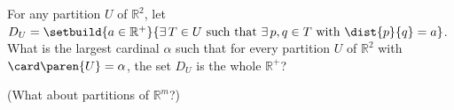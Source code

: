 For any partition $U$ of $\mathbb{R}^2$, let
$D_U = \setbuild{a \in \mathbb{R}^{+}}
         {\exists \, T \in U
          \text{ such that } \exists \, p, q \in T
          \text{ with } \dist{p}{q} = a}$.
What is the largest cardinal $\alpha$
such that for every partition $U$ of $\mathbb{R}^{2}$
with $\card\paren{U} = \alpha$,
the set $D_U$ is the whole $\mathbb{R}^{+}$?

(What about partitions of $\mathbb{R}^m$?)
